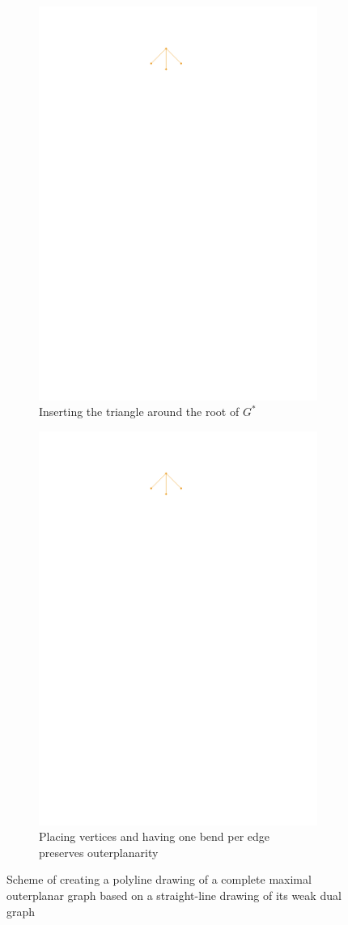 \begin{figure}[H]
	\centering
	\begin{subfigure}{0.49\textwidth}
		\centering
		\includegraphics[page=2,width=0.49\linewidth]{graphics/outerplanar_weak_dual_illustration.pdf}
		\caption{Inserting the triangle around the root of $G^*$}
	\end{subfigure}
	\begin{subfigure}{0.49\textwidth}
		\centering
		\includegraphics[page=3,width=0.49\linewidth]{graphics/outerplanar_weak_dual_illustration.pdf}
		\caption{Placing vertices and having one bend per edge preserves outerplanarity}
	\end{subfigure}
	\caption{Scheme of creating a polyline drawing of a complete maximal outerplanar graph based on a straight-line drawing of its weak dual graph}
\end{figure}
